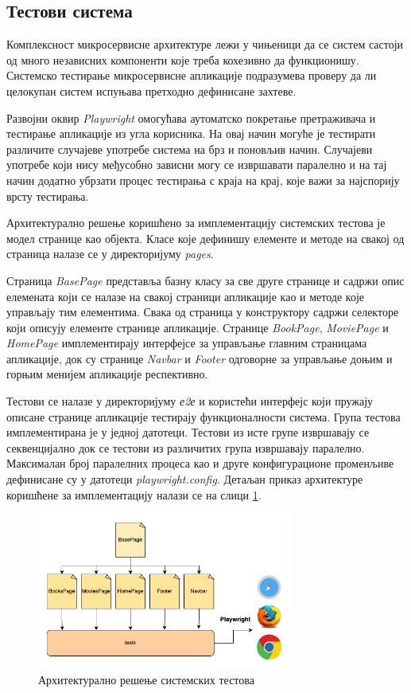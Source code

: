 \documentclass[12pt,oneside]{memoir}
\begin{document}

\subsection{Тестови система}

Комплексност микросервисне архитектуре лежи у чињеници да се систем састоји од много независних компоненти које треба кохезивно да функционишу. Системско тестирање микросервисне апликације подразумева проверу да ли целокупан систем испуњава претходно дефинисане захтеве.

Развојни оквир \textit{Playwright} омогућава аутоматско покретање претраживача и тестирање апликације из угла корисника. На овај начин могуће је тестирати различите случајеве употребе система на брз и поновљив начин. Случајеви употребе који нису међусобно зависни могу се извршавати паралелно и на тај начин додатно убрзати процес тестирања с краја на крај, које важи за најспорију врсту тестирања.

Архитектурално решење коришћено за имплементацију системских тестова  је модел странице као објекта. Класе које дефинишу елементе и методе на свакој од страница налазе се у директоријуму \textit{pages}. 

Страница \textit{BasePage} представља базну класу за све друге странице и садржи опис елемената који се налазе на свакој страници апликације као и методе које управљају тим елементима.  Свака од страница у конструктору садржи селекторе који описују елементе странице апликације. Странице \textit{BookPage}, \textit{MoviePage} и \textit{HomePage} имплементирају интерфејсе за управљање главним страницама апликације, док су странице \textit{Navbar} и \textit{Footer} одговорне за управљање доњим и горњим менијем апликације респективно.

Тестови се налазе у директоријуму \textit{е2е} и користећи интерфејс који пружају описане странице апликације тестирају функционалности система. Група тестова имплементирана је у једној датотеци. Тестови из исте групе извршавају се секвенцијално док се тестови из различитих група извршавају паралелно. Максималан број паралелних процеса као и друге конфигурационе променљиве дефинисане су у датотеци \textit{playwright.config}. Детаљан приказ архитектуре коришћене за имплементацију налази се на слици \ref{fig:arhitektura}.

\begin{figure}[!ht]
  \centering
  \includegraphics[width=0.75\textwidth]{matfmaster/img/arhitektura.png}
  \caption{Архитектурално решење системских тестова}
  \label{fig:arhitektura}
\end{figure}
\end{document}
